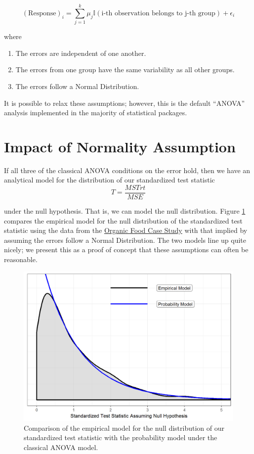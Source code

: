 \documentclass[]{book}
\providecommand{\tightlist}{%
  \setlength{\itemsep}{0pt}\setlength{\parskip}{0pt}}
\theoremstyle{definition}
\theoremstyle{definition}
\theoremstyle{remark}
\begin{document}
\[(\text{Response})_i = \sum_{j=1}^{k} \mu_j \mathbb{I}(\text{i-th observation belongs to j-th group}) + \epsilon_i\]

where

\begin{enumerate}
\def\labelenumi{\arabic{enumi}.}
\tightlist
\item
  The errors are independent of one another.
\item
  The errors from one group have the same variability as all other
  groups.
\item
  The errors follow a Normal Distribution.
\end{enumerate}

It is possible to relax these assumptions; however, this is the default
``ANOVA'' analysis implemented in the majority of statistical packages.

\section{Impact of Normality
Assumption}\label{impact-of-normality-assumption}

If all three of the classical ANOVA conditions on the error hold, then
we have an analytical model for the distribution of our standardized
test statistic \[T = \frac{MSTrt}{MSE}\]

under the null hypothesis. That is, we can model the null distribution.
Figure \ref{fig:anovaclassical-organic-model} compares the empirical
model for the null distribution of the standardized test statistic using
the data from the \protect\hyperlink{CaseOrganic}{Organic Food Case
Study} with that implied by assuming the errors follow a Normal
Distribution. The two models line up quite nicely; we present this as a
proof of concept that these assumptions can often be reasonable.

\begin{figure}

{\centering \includegraphics[width=0.8\linewidth]{./Images/anovaclassical-organic-model-1} 

}

\caption{Comparison of the empirical model for the null distribution of our standardized test statistic with the probability model under the classical ANOVA model.}\label{fig:anovaclassical-organic-model}
\end{figure}
\end{document}
